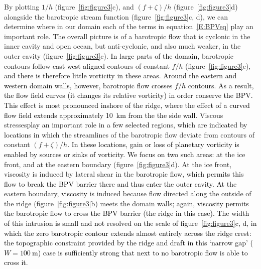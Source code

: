 \documentclass[draft]{agujournal2019}
\newcommand{\rout}[1]{\red{\st{#1}}}\newcommand{\ab}[1]{\textcolor{Green}{#1}}\newcommand{\about}[1]{\textcolor{Cyan}{\sout{#1}}}
\newcommand{\blue}[1]{\textcolor{blue}{#1}}
\newcommand{\red}[1]{\textcolor{red}{#1}}
\renewcommand{\rout}[1]{{}} %
\renewcommand{\blue}[1]{{\textcolor{black}{#1}}} %
\renewcommand{\red}[1]{{}} %
\begin{document}
By plotting $1/h$ (figure~\ref{fig:figure3}c), and $(f + \zeta)/h$ (figure~\ref{fig:figure3}d) alongside the barotropic stream function (figure~\ref{fig:figure3}c, d), we can determine where in our domain each of the terms in equation~\eqref{E:BPVeq} play an important role. The overall picture is of a barotropic flow that is cyclonic in the inner cavity and open ocean, but anti-cyclonic, and also much weaker, in the outer cavity (figure~\ref{fig:figure3}c). \rout{ Away from the domain boundaries,}\blue{In large parts of the domain,} barotropic contours \rout{predominantly} follow \blue{east-west aligned} contours of constant $f/h$ (figure~\ref{fig:figure3}c), \rout{aligned east-west} \blue{and there is therefore little vorticity in these areas}. \blue{Around the eastern and western domain walls, however, barotropic flow crosses $f/h$ contours. As a result, the flow field curves (it changes its relative vorticity) in order conserve the BPV. This effect is most pronounced inshore of the ridge, where the effect of a curved flow field extends approximately 10~km from the the side wall.} \rout{Contours of constant $(f + \zeta)/h$ deviate from these east-west aligned $f/h$ contours at the domain boundaries: relative vorticity plays an important role at boundaries, where the contours of constant water column thickness are blocked by the presence of the domain walls.} Viscous stresses\blue{play an}\rout{are} important \blue{role} in \blue{a few selected} regions\blue{, which are indicated by locations in which} \rout{where} the streamlines of the barotropic flow deviate from contours of constant $(f + \zeta)/h$\blue{. In these locations, gain or loss of planetary vorticity is enabled by sources or sinks of vorticity.} \rout{, i.e.} \blue{We focus on two such areas:} at the ice front, and at the eastern boundary (figure~\ref{fig:figure3}d). At the ice front, \rout{vorticity}\blue{viscosity} is induced by lateral shear in the \rout{water column}\blue{barotropic flow}, \blue{which permits this flow to break the} \rout{topographic constraint}\blue{BPV barrier there and thus enter the outer cavity.} \rout{while a}\blue{A}t the eastern boundary, \rout{vorticity}\blue{viscosity} is induced because flow directed along the outside of the ridge (figure~\ref{fig:figure3}b) meets the domain walls\blue{; again, viscosity permits the barotropic flow to cross the BPV barrier (the ridge in this case). The width of this intrusion is small and not resolved on the scale of figure~\ref{fig:figure3}c, d, in which the zero barotropic contour extends almost entirely across the ridge crest: the topographic constraint provided by the ridge and draft in this `narrow gap' ($W=100~\text{m}$) case is sufficiently strong that next to no barotropic flow is able to cross it.}
\end{document}
